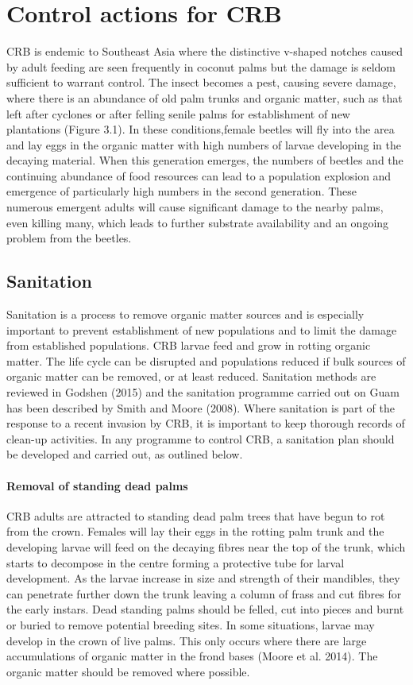 \documentclass[twocolumn,letterpaper]{scrartcl}
\begin{document}
\section{Control actions for CRB}

CRB is endemic to Southeast Asia where the distinctive v-shaped notches caused by adult feeding are seen frequently in coconut palms but the damage is seldom sufficient to warrant control. The insect becomes a pest, 
causing severe damage, where there is an abundance of old palm trunks and organic matter, such as that left after cyclones or after felling senile palms for establishment of new plantations (Figure 3.1). In these conditions,female beetles will fly into the area and lay eggs in the organic matter with high numbers of larvae developing in the decaying material. When this generation emerges, the numbers of beetles and the continuing abundance 
of food resources can lead to a population explosion and emergence of particularly high numbers in the second generation. These numerous emergent adults will cause significant damage to the nearby palms, even killing 
many, which leads to further substrate availability and an ongoing problem from the beetles. 

\subsection{Sanitation}

Sanitation is a process to remove organic matter sources and is especially important to prevent establishment of new populations and to limit the damage from established populations. CRB larvae feed and grow in rotting organic  matter.  The  life  cycle  can  be  disrupted  and  populations  reduced  if  bulk  sources  of  organic  matter can be removed, or at least reduced. Sanitation methods are reviewed in Godshen (2015) and the sanitation 
programme carried out on Guam has been described by Smith and Moore (2008). Where sanitation is part of the response to a recent invasion by CRB, it is important to keep thorough records of clean-up activities. In any programme to control CRB, a sanitation plan should be developed and carried out, as outlined below.

\paragraph{Removal of standing dead palms}
CRB adults are attracted to standing dead palm trees that have begun to rot from the crown. Females will lay their eggs in the rotting palm trunk and the developing larvae will feed on the decaying fibres near the top of the trunk, which starts to decompose in the centre forming a protective tube for larval development. As the larvae increase in size and strength of their mandibles, they can penetrate further down the trunk leaving a column of frass and cut fibres for the early instars. Dead standing palms should be felled, cut into pieces and burnt or buried to remove potential breeding sites. In some situations, larvae may develop in the crown of live palms. This only occurs where there are large accumulations of organic matter in the frond bases (Moore et al. 2014). The organic matter should be removed where possible.
\end{document}
